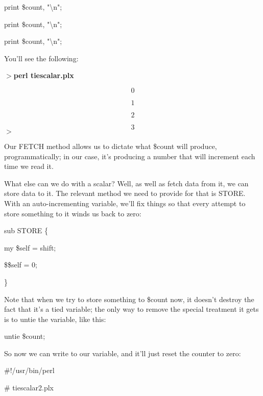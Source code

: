 \documentclass[a4paper,11pt]{book}
\begin{document}
\noindent print \$count, "\textbackslash n";

\noindent print \$count, "\textbackslash n";

\noindent print \$count, "\textbackslash n";

\noindent 

\noindent You'll see the following:

\noindent 

\noindent $>$\textbf{perl tiescalar.plx}

\[0\] 

\[1\] 

\[2\] 

\[3\] 
$>$

\noindent 

\noindent Our FETCH method allows us to dictate what \$count will produce, programmatically; in our case, it's producing a number that will increment each time we read it.

\noindent 

\noindent What else can we do with a scalar? Well, as well as fetch data from it, we can store data to it. The relevant method we need to provide for that is STORE. With an auto-incrementing variable, we'll fix things so that every attempt to store something to it winds us back to zero:

\noindent 

\noindent 

\noindent sub STORE \{

\noindent my \$self = shift;

\noindent \$\$self = 0;

\noindent \}

\noindent 

\noindent Note that when we try to store something to \$count now, it doesn't destroy the fact that it's a tied variable; the only way to remove the special treatment it gets is to untie the variable, like this:

\noindent 

\noindent 

\noindent untie \$count;

\noindent 

\noindent So now we can write to our variable, and it'll just reset the counter to zero:

\noindent 

\noindent 

\noindent \#!/usr/bin/perl

\noindent \# tiescalar2.plx
\end{document}
